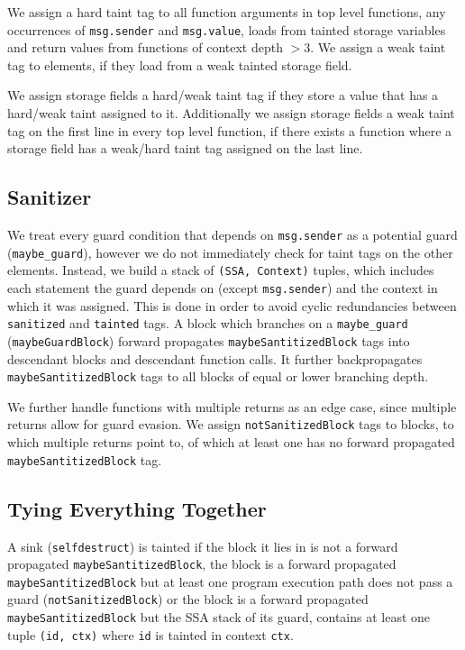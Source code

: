\documentclass[11pt,a4paper]{article}
\begin{document}
We assign a hard taint tag to all function arguments in top level functions, any occurrences of \lstinline{msg.sender} and \lstinline{msg.value}, loads from tainted storage variables and return values from functions of context depth $>3$.
We assign a weak taint tag to elements, if they load from a weak tainted storage field.



We assign storage fields a hard/weak taint tag if they store a value that has a hard/weak taint assigned to it.
Additionally we assign storage fields a weak taint tag on the first line in every top level function, if there exists a function where a storage field has a weak/hard taint tag assigned on the last line.



\subsection{Sanitizer}

We treat every guard condition that depends on \lstinline{msg.sender} as a potential guard (\lstinline{maybe_guard}), however we do not immediately check for taint tags on the other elements.
Instead, we build a stack of \lstinline{(SSA, Context)} tuples, which includes each statement the guard depends on (except \lstinline{msg.sender}) and the context in which it was assigned.
This is done in order to avoid cyclic redundancies between \lstinline{sanitized} and \lstinline{tainted} tags.
A block which branches on a \lstinline{maybe_guard} (\lstinline{maybeGuardBlock}) forward propagates \lstinline{maybeSantitizedBlock} tags into descendant blocks and descendant function calls.
It further backpropagates \lstinline{maybeSantitizedBlock} tags to all blocks of equal or lower branching depth.

We further handle functions with multiple returns as an edge case, since multiple returns allow for guard evasion.
We assign \lstinline{notSanitizedBlock} tags to blocks, to which multiple returns point to, of which at least one has no forward propagated \lstinline{maybeSantitizedBlock} tag.



\subsection{Tying Everything Together}
A sink (\lstinline{selfdestruct}) is tainted if the block it lies in is not a forward propagated \lstinline{maybeSantitizedBlock}, the block is a forward propagated \lstinline{maybeSantitizedBlock} but at least one program execution path does not pass a guard (\lstinline{notSanitizedBlock}) or the block is a forward propagated \lstinline{maybeSantitizedBlock} but the SSA stack of its guard, contains at least one tuple \lstinline{(id, ctx)} where \lstinline{id} is tainted in context \lstinline{ctx}.
\end{document}
